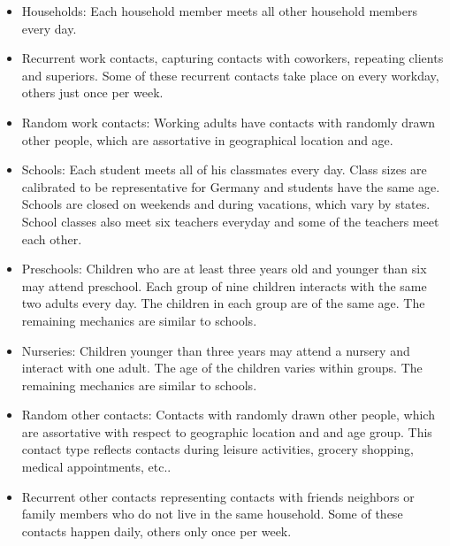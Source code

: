 \begin{itemize}
    \item Households: Each household member meets all other household members every day.


    \item Recurrent work contacts, capturing contacts with coworkers, repeating
          clients and superiors. Some of these recurrent contacts take place on
          every workday, others just once per week.

    \item Random work contacts: Working adults have contacts with randomly drawn other
          people, which are assortative in geographical location and age.


    \item Schools: Each student meets all of his classmates every day. Class sizes are
    calibrated to be representative for Germany and students have the same age. Schools
    are closed on weekends and during vacations, which vary by states. School classes
    also meet six teachers everyday and some of the teachers meet each other.

    \item Preschools: Children who are at least three years old and younger than six may
    attend preschool. Each group of nine children interacts with the same two adults
    every day. The children in each group are of the same age. The remaining mechanics
    are similar to schools.

    \item Nurseries: Children younger than three years may attend a nursery and interact
    with one adult. The age of the children varies within groups. The remaining
    mechanics are similar to schools.

    \item Random other contacts: Contacts with randomly drawn other
    people, which are assortative with respect to geographic location and and age group.
    This contact type reflects contacts during leisure activities, grocery shopping,
    medical appointments, etc..

    \item Recurrent other contacts representing contacts with friends neighbors or
        family members who do not live in the same household. Some of these contacts
        happen daily, others only once per week.


\end{itemize}

